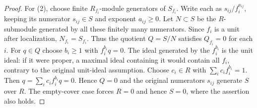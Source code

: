 \begin{proof}
For (2), choose finite $R_{f_i}$-module generators of $S_{f_i}$.
Write each as $s_{ij}/f_i^{a_{ij}}$, keeping its numerator
$s_{ij}\in S$ and exponent $a_{ij}\geq0$.
Let $N\subset S$ be the $R$-submodule generated by all these
finitely many numerators. Since $f_i$ is a unit after localization,
$N_{f_i}=S_{f_i}$. Thus the quotient $Q=S/N$ satisfies $Q_{f_i}=0$
for each $i$. For $q\in Q$ choose $b_i\geq1$ with $f_i^{b_i}q=0$.
The ideal generated by the $f_i^{b_i}$ is the unit ideal: if it were
proper, a maximal ideal containing it would contain all $f_i$,
contrary to the original unit-ideal assumption. Choose $c_i\in R$
with $\sum_i c_if_i^{b_i}=1$. Then
$q=\sum_i c_if_i^{b_i}q=0$. Hence $Q=0$ and the original numerators
$s_{ij}$ generate $S$ over $R$. The empty-cover case forces $R=0$
and hence $S=0$, where the assertion also holds.
\end{proof}